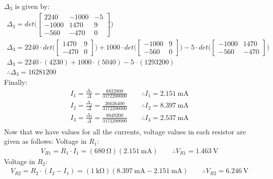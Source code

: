 \documentclass[letterpaper]{article}
\begin{document}
$\Delta_3$ is given by:
    \begin{gather*}
        \Delta_3 = det\Bigg(
        \begin{bmatrix}
            2240 & -1000 & -5\\
            -1000 & 1470 & 9\\
            -560 & -470 & 0
        \end{bmatrix}
        \Bigg)\\
        \Delta_3 = 2240\cdot det\bigg(
        \begin{bmatrix}
            1470 & 9\\
            -470 & 0 
        \end{bmatrix}
        \bigg)
        +1000\cdot det\bigg(
        \begin{bmatrix}
            -1000 & 9\\
            -560 & 0
        \end{bmatrix}
        \bigg)
        -5\cdot det\bigg(
        \begin{bmatrix}
            -1000 & 1470\\
            -560 & -470
        \end{bmatrix}
        \bigg)\\
        \Delta_3 = 2240\cdot(4230)+1000\cdot(5040)-5\cdot(1293200)\\
        \therefore\Delta_3 = 16281200
    \end{gather*}
Finally:
\begin{gather*}
I_1 = \frac{\Delta_1}{\Delta} = \frac{6822800}{3172200000}\qquad\therefore I_1 =
\SI{2.151}{\milli\ampere}\\
I_2 = \frac{\Delta_2}{\Delta} = \frac{26636400}{3172200000}\qquad\therefore I_2 =
\SI{8.397}{\milli\ampere}\\
I_3 = \frac{\Delta_3}{\Delta} = \frac{8049200}{3172200000}\qquad\therefore I_3 =
\SI{2.537}{\milli\ampere}\\
\end{gather*}
Now that we have values for all the currents, voltage values in each resistor are given as follows:
Voltage in $R_1$:
\begin{gather*}V_{R1} = R_1\cdot I_1
    =(\SI{680}{\ohm})(\SI{2.151}{\milli\ampere})\qquad\therefore V_{R1} =
\SI{1.463}{\volt}
\end{gather*}
Voltage in $R_2$:
\begin{gather*}V_{R2} = R_2\cdot(I_2-I_1)
    =(\SI{1}{\kilo\ohm})(\SI{8.397}{\milli\ampere}-\SI{2.151}{\milli\ampere})\qquad\therefore V_{R2} =
\SI{6.246}{\volt}
\end{gather*}
\end{document}
